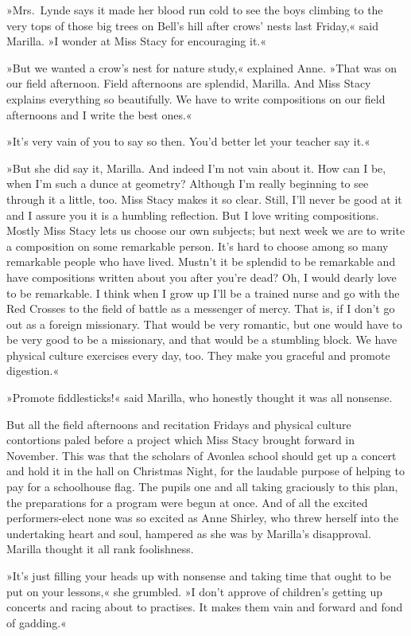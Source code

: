 »Mrs.~Lynde says it made her blood run cold to see the boys climbing to the very tops of those big trees on Bell's hill after crows' nests last Friday,« said Marilla. »I wonder at Miss Stacy for encouraging it.«

»But we wanted a crow's nest for nature study,« explained Anne. »That was on our field afternoon. Field afternoons are splendid, Marilla. And Miss Stacy explains everything so beautifully. We have to write compositions on our field afternoons and I write the best ones.«

»It's very vain of you to say so then. You'd better let your teacher say it.«

»But she did say it, Marilla. And indeed I'm not vain about it. How can I be, when I'm such a dunce at geometry? Although I'm really beginning to see through it a little, too. Miss Stacy makes it so clear. Still, I'll never be good at it and I assure you it is a humbling reflection. But I love writing compositions. Mostly Miss Stacy lets us choose our own subjects; but next week we are to write a composition on some remarkable person. It's hard to choose among so many remarkable people who have lived. Mustn't it be splendid to be remarkable and have compositions written about you after you're dead? Oh, I would dearly love to be remarkable. I think when I grow up I'll be a trained nurse and go with the Red Crosses to the field of battle as a messenger of mercy. That is, if I don't go out as a foreign missionary. That would be very romantic, but one would have to be very good to be a missionary, and that would be a stumbling block. We have physical culture exercises every day, too. They make you graceful and promote digestion.«

»Promote fiddlesticks!« said Marilla, who honestly thought it was all nonsense.

But all the field afternoons and recitation Fridays and physical culture contortions paled before a project which Miss Stacy brought forward in November. This was that the scholars of Avonlea school should get up a concert and hold it in the hall on Christmas Night, for the laudable purpose of helping to pay for a schoolhouse flag. The pupils one and all taking graciously to this plan, the preparations for a program were begun at once. And of all the excited performers-elect none was so excited as Anne Shirley, who threw herself into the undertaking heart and soul, hampered as she was by Marilla's disapproval. Marilla thought it all rank foolishness.

»It's just filling your heads up with nonsense and taking time that ought to be put on your lessons,« she grumbled. »I don't approve of children's getting up concerts and racing about to practises. It makes them vain and forward and fond of gadding.«

